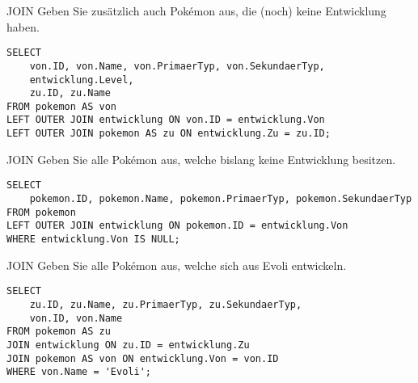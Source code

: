 \begin{example}{JOIN}
    Geben Sie zusätzlich auch Pokémon aus, die (noch) keine Entwicklung haben.

    \exampleseparator

    \begin{verbatim}
SELECT
    von.ID, von.Name, von.PrimaerTyp, von.SekundaerTyp,
    entwicklung.Level,
    zu.ID, zu.Name
FROM pokemon AS von
LEFT OUTER JOIN entwicklung ON von.ID = entwicklung.Von
LEFT OUTER JOIN pokemon AS zu ON entwicklung.Zu = zu.ID;
    \end{verbatim}

    
\end{example}

\begin{example}{JOIN}
    Geben Sie alle Pokémon aus, welche bislang keine Entwicklung besitzen.

    \exampleseparator

    \begin{verbatim}
SELECT
    pokemon.ID, pokemon.Name, pokemon.PrimaerTyp, pokemon.SekundaerTyp
FROM pokemon
LEFT OUTER JOIN entwicklung ON pokemon.ID = entwicklung.Von
WHERE entwicklung.Von IS NULL;
    \end{verbatim}

    
\end{example}

\begin{example}{JOIN}
    Geben Sie alle Pokémon aus, welche sich aus Evoli entwickeln.

    \exampleseparator

    \begin{verbatim}
SELECT
    zu.ID, zu.Name, zu.PrimaerTyp, zu.SekundaerTyp,
    von.ID, von.Name
FROM pokemon AS zu
JOIN entwicklung ON zu.ID = entwicklung.Zu
JOIN pokemon AS von ON entwicklung.Von = von.ID
WHERE von.Name = 'Evoli';
    \end{verbatim}

    
\end{example}